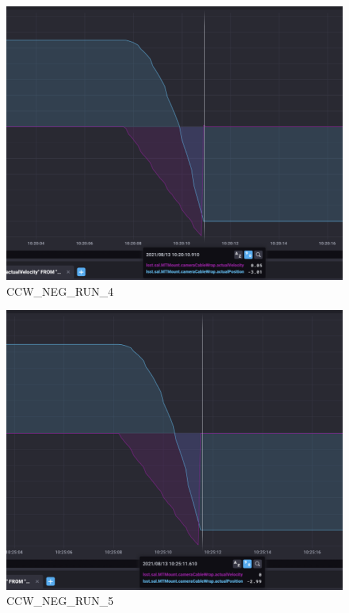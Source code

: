 \documentclass[SE,lsstdraft,authoryear,toc]{lsstdoc}
\begin{document}
\begin{figure}
  \includegraphics[width=\linewidth]{media/ccw_neg_4.png}
  \caption{CCW\_NEG\_RUN\_4}
  \label{fig:CCW_NEG_RUN_4}
\end{figure}

\begin{figure}
  \includegraphics[width=\linewidth]{media/ccw_neg_5.png}
  \caption{CCW\_NEG\_RUN\_5}
  \label{fig:CCW_NEG_RUN_5}
\end{figure}
\end{document}
